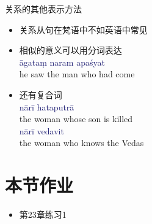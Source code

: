 \documentclass[17pt]{beamer}
\newcommand{\fullsentence}[1]{\textcolor{MidnightBlue}{#1}}
\begin{document}
\begin{frame}{关系的其他表示方法}
  \small
  \centering
  \begin{itemize}
    \item 关系从句在梵语中不如英语中常见
    \item 相似的意义可以用分词表达\\
    \fullsentence{āgataṃ naram apaśyat} \\he saw the man who had come
    \item 还有复合词\\    
    \fullsentence{nārī hataputrā} \\the woman whose son is killed\\
    \fullsentence{nārī vedavit} \\the woman who knows the Vedas
  \end{itemize}  
\end{frame}

\section{本节作业}

\begin{frame}{\insertsection }
  \begin{itemize}
    \item
      第23章练习1
  \end{itemize}
\end{frame}  
\end{document}
